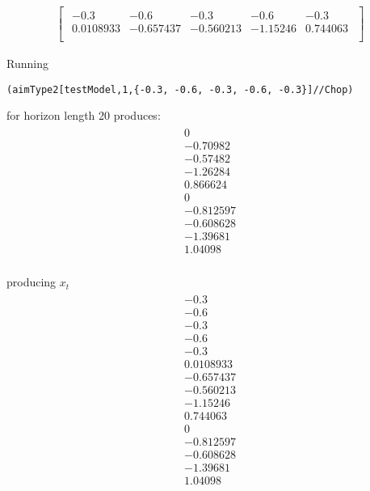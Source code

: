 \begin{gather*}
  \begin{bmatrix}\begin{array}{ccccc}
 -0.3 & -0.6 & -0.3 & -0.6 & -0.3 \\
 0.0108933 & -0.657437 & -0.560213 & -1.15246 & 0.744063 \\
\end{array}
\end{bmatrix}\end{gather*}

Running 
\begin{verbatim}
(aimType2[testModel,1,{-0.3, -0.6, -0.3, -0.6, -0.3}]//Chop)
\end{verbatim}
for horizon length 20 produces:
{\small
\begin{gather*}\begin{array}{c}
 0 \\
 -0.70982 \\
 -0.57482 \\
 -1.26284 \\
 0.866624 \\
 0 \\
 -0.812597 \\
 -0.608628 \\
 -1.39681 \\
 1.04098 \\
\end{array}
\end{gather*}
}




producing $x_t$
\begin{gather*}\begin{array}{c}
 -0.3 \\
 -0.6 \\
 -0.3 \\
 -0.6 \\
 -0.3 \\
 0.0108933 \\
 -0.657437 \\
 -0.560213 \\
 -1.15246 \\
 0.744063 \\
 0 \\
 -0.812597 \\
 -0.608628 \\
 -1.39681 \\
 1.04098 \\
\end{array}
\end{gather*}




